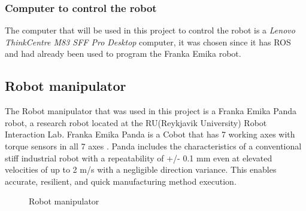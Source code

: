 \subsubsection*{Computer to control the robot}
The computer that will be used in this project to control the robot is a \textit{Lenovo ThinkCentre M83 SFF Pro Desktop}\cite{noauthor_thinkcentre_nodate} computer, it was chosen since it has ROS and had already been used to program the Franka Emika robot. 

\clearpage

\subsection{Robot manipulator\label{subsec:robot}}
The Robot manipulator that was used in this project is a Franka Emika Panda robot, a research robot located at the RU(Reykjavik University) Robot Interaction Lab. Franka Emika Panda is a Cobot that has 7 working axes with torque sensors in all 7 axes \cite{gmbh_franka_nodate}. Panda includes the characteristics of a conventional stiff industrial robot with a repeatability of +/- 0.1 mm even at elevated velocities of up to 2 m/s with a negligible direction variance. This enables accurate, resilient, and quick manufacturing method execution. 
\begin{figure}[h]
    \centering
    \hfill
    \caption{Robot manipulator}
    \label{figure: frankaemika}
\end{figure}
